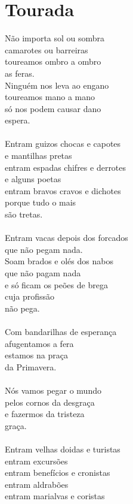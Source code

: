 \documentclass{article}
\begin{document}
\section{ Tourada}
Não importa sol ou sombra \\
camarotes ou barreiras \\
toureamos ombro a ombro \\
as feras. \\
Ninguém nos leva ao engano \\
toureamos mano a mano \\
só nos podem causar dano \\
espera. \\
\\
Entram guizos chocas e capotes \\
e mantilhas pretas \\
entram espadas chifres e derrotes \\
e alguns poetas \\
entram bravos cravos e dichotes \\
porque tudo o mais \\
são tretas. \\
\\
Entram vacas depois dos forcados \\
que não pegam nada. \\
Soam brados e olés dos nabos \\
que não pagam nada \\
e só ficam os peões de brega \\
cuja profissão \\
não pega. \\
\\
Com bandarilhas de esperança \\
afugentamos a fera \\
estamos na praça \\
da Primavera. \\
\\
Nós vamos pegar o mundo \\
pelos cornos da desgraça \\
e fazermos da tristeza \\
graça. \\
\\
Entram velhas doidas e turistas \\
entram excursões \\
entram benefícios e cronistas \\
entram aldrabões \\
entram marialvas e coristas \\
\end{document}
